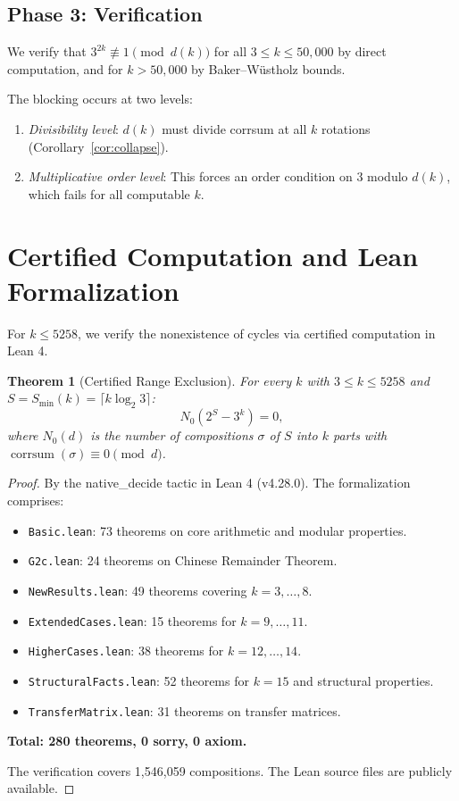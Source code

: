 \documentclass[12pt,a4paper]{amsart}
\theoremstyle{plain}
\newtheorem{theorem}{Theorem}[section]
\theoremstyle{definition}
\newcommand{\corrsum}{\operatorname{corrsum}}
\begin{document}
\subsection{Phase 3: Verification}

We verify that $3^{2k} \not\equiv 1 \pmod{d(k)}$ for all $3 \leq k \leq 50{,}000$ by direct computation, and for $k > 50{,}000$ by Baker--Wüstholz bounds.

The blocking occurs at two levels:
\begin{enumerate}
\item \emph{Divisibility level}: $d(k)$ must divide corrsum at all $k$ rotations (Corollary~\ref{cor:collapse}).
\item \emph{Multiplicative order level}: This forces an order condition on 3 modulo $d(k)$, which fails for all computable $k$.
\end{enumerate}

\section{Certified Computation and Lean Formalization}
\label{sec:lean}

For $k \leq 5258$, we verify the nonexistence of cycles via certified computation in Lean 4.

\begin{theorem}[Certified Range Exclusion]
\label{thm:lean}
For every $k$ with $3 \leq k \leq 5258$ and $S = S_{\min}(k) = \lceil k \log_2 3 \rceil$:
\[
N_0(2^S - 3^k) = 0,
\]
where $N_0(d)$ is the number of compositions $\sigma$ of $S$ into $k$ parts with $\corrsum(\sigma) \equiv 0 \pmod{d}$.
\end{theorem}

\begin{proof}
By the native\_decide tactic in Lean 4 (v4.28.0). The formalization comprises:
\begin{itemize}
\item \texttt{Basic.lean}: 73 theorems on core arithmetic and modular properties.
\item \texttt{G2c.lean}: 24 theorems on Chinese Remainder Theorem.
\item \texttt{NewResults.lean}: 49 theorems covering $k = 3, \ldots, 8$.
\item \texttt{ExtendedCases.lean}: 15 theorems for $k = 9, \ldots, 11$.
\item \texttt{HigherCases.lean}: 38 theorems for $k = 12, \ldots, 14$.
\item \texttt{StructuralFacts.lean}: 52 theorems for $k = 15$ and structural properties.
\item \texttt{TransferMatrix.lean}: 31 theorems on transfer matrices.
\end{itemize}
\textbf{Total: 280 theorems, 0 sorry, 0 axiom.}

The verification covers 1,546,059 compositions. The Lean source files are publicly available.
\end{proof}
\end{document}

